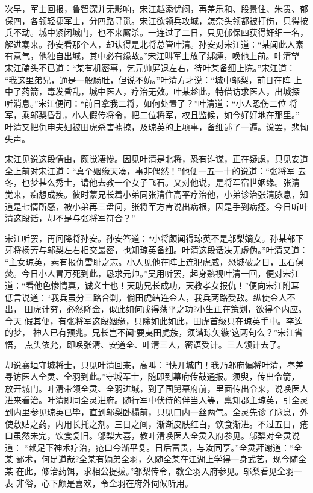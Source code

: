 次早，军士回报，鲁智深并无影响，宋江越添忧闷，再差乐和、段景住、朱贵、郁
保四，各领轻捷军士，分四路寻觅。宋江欲领兵攻城，怎奈头领都被打伤，只得按
兵不动。城中紧闭城门，也不来厮杀。一连过了二日，只见郁保四获得奸细一名，
解进寨来。孙安看那个人，却认得是北将总管叶清。孙安对宋江道：“某闻此人素
有意气，他独自出城，其中必有缘故。”宋江叫军士放了绑缚，唤他上前。叶清望
宋江磕头不已道：“某有机密事，乞元帅屏退左右，待叶某备细上陈。”宋江道：
“我这里弟兄，通是一般肠肚，但说不妨。”叶清方才说：“城中邬梨，前日在阵
上中了药箭，毒发昏乱，城中医人，疗治无效。叶某趁此，特借访求医人，出城探
听消息。”宋江便问：“前日拿我二将，如何处置了？”叶清道：“小人恐伤二位
将军，乘邬梨昏乱，小人假传将令，把二位将军，权且监候，如今好好地在那里。”
叶清又把仇申夫妇被田虎杀害掳掠，及琼英的上项事，备细述了一遍。说罢，悲恸
失声。

宋江见说这段情由，颇觉凄惨。因见叶清是北将，恐有诈谋，正在疑虑，只见安道
全上前对宋江道：“真个姻缘天凑，事非偶然！”他便一五一十的说道：“张将军
去冬，也梦甚么秀士，请他去教一个女子飞石。又对他说，是将军宿世姻缘。张清
觉来，痴想成疾。彼时蒙兄长着小弟同张清住高平疗治他，小弟诊治张清脉息，知
道是七情所感，被小弟再三盘问，张将军方肯说出病根，因是手到病痊。今日听叶
清这段话，却不是与张将军符合？”

宋江听罢，再问降将孙安。孙安答道：“小将颇闻得琼英不是邬梨嫡女。孙某部下
牙将杨芳与邬梨左右相交最密，也知琼英备细。叶清这段话决无虚伪。”叶清又道：
“主女琼英，素有报仇雪耻之志。小人见他在阵上连犯虎威，恐城破之日，玉石俱
焚。今日小人冒万死到此，恳求元帅。”吴用听罢，起身熟视叶清一回，便对宋江
道：“看他色惨情真，诚义士也！天助兄长成功，天教孝女报仇！”便向宋江附耳
低言说道：“我兵虽分三路合剿，倘田虎结连金人，我兵两路受敌。纵使金人不出，
田虎计穷，必然降金，似此如何成得荡平之功?小生正在策划，欲得个内应。今天
假其便，有张将军这段姻缘，只除如此如此，田虎首级只在琼英手中。李逵的梦，
神人已有预兆。兄长岂不闻‘要夷田虎族，须谐琼矢镞’这两句么？”宋江省悟，
点头依允，即唤张清、安道全、叶清三人，密语受计。三人领计去了。

却说襄垣守城将士，只见叶清回来，高叫：“快开城门！我乃邬府偏将叶清，奉差
寻访医人全灵、全羽到此。”守城军士，随即到幕府传鼓通报。须臾，传出令箭，
放开城门。叶清带领全灵、全羽进城，到了国舅幕府前，里面传出令来，说唤医人
进来看治。叶清即同全灵进府。随行军中伏侍的伴当人等，禀知郡主琼英，引全灵
到内里参见琼英已毕，直到邬梨卧榻前，只见口内一丝两气。全灵先诊了脉息，外
使敷贴之药，内用长托之剂。三日之间，渐渐皮肤红白，饮食渐进。不过五日，疮
口虽然未完，饮食复旧。邬梨大喜，教叶清唤医人全灵入府参见。邬梨对全灵说道：
“赖足下神术疗治，疮口今渐平复。日后富贵，与汝同享。”全灵拜谢道：“全某
鄙术，何足道哉?全某有嫡弟全羽，久随全某在江湖上学得一身武艺，现今随全某
在此，修治药饵，求相公提拔。”邬梨传令，教全羽入府参见。邬梨看见全羽一表
非俗，心下颇是喜欢，令全羽在府外伺候听用。

